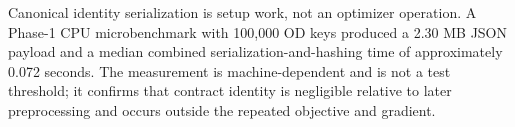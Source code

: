 Canonical identity serialization is setup work, not an optimizer operation.  A
Phase-1 CPU microbenchmark with 100,000 OD keys produced a 2.30 MB JSON payload
and a median combined serialization-and-hashing time of approximately
0.072 seconds.  The measurement is machine-dependent and is not a test
threshold; it confirms that contract identity is negligible relative to later
preprocessing and occurs outside the repeated objective and gradient.

